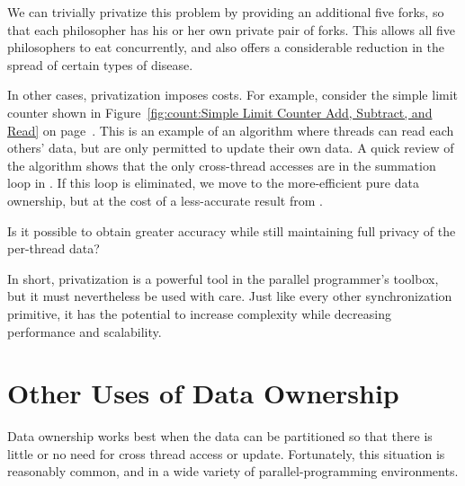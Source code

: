 We can trivially privatize this problem by providing an additional five
forks, so that each philosopher has his or her own private pair of forks.
This allows all five philosophers to eat concurrently, and also offers
a considerable reduction in the spread of certain types of disease.

In other cases, privatization imposes costs.
For example, consider the simple limit counter shown in
Figure~\ref{fig:count:Simple Limit Counter Add, Subtract, and Read} on
page~\pageref{fig:count:Simple Limit Counter Add, Subtract, and Read}.
This is an example of an algorithm where threads can read each others'
data, but are only permitted to update their own data.
A quick review of the algorithm shows that the only cross-thread
accesses are in the summation loop in .
If this loop is eliminated, we move to the more-efficient pure
data ownership, but at the cost of a less-accurate result
from .

\QuickQuiz{}
	Is it possible to obtain greater accuracy while still
	maintaining full privacy of the per-thread data?
 \QuickQuizEnd

In short, privatization is a powerful tool in the parallel programmer's
toolbox, but it must nevertheless be used with care.
Just like every other synchronization primitive, it has the potential
to increase complexity while decreasing performance and scalability.

\section{Other Uses of Data Ownership}
\label{sec:owned:Other Uses of Data Ownership}

Data ownership works best when the data can be partitioned so that there
is little or no need for cross thread access or update.
Fortunately, this situation is reasonably common, and in a wide variety
of parallel-programming environments.

